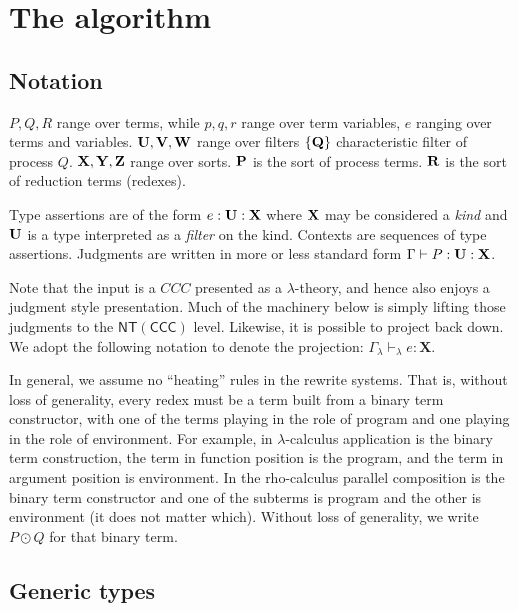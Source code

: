 \section{The algorithm}
\subsection{Notation}
$P, Q, R$ range over terms, while $p, q, r$ range over term variables,
$e$ ranging over terms and variables.  $\bold{U}, \bold{V}, \bold{W}$
range over filters $\bold{\{ Q \}}$ characteristic filter of process
$Q$.  $\bold{X}, \bold{Y}, \bold{Z}$ range over sorts.  $\bold{P}$ is
the sort of process terms.  $\bold{R}$ is the sort of reduction terms
(redexes).

Type assertions are of the form $e : \bold{U} : \bold{X}$ where
$\bold{X}$ may be considered a \emph{kind} and $\bold{U}$ is a type
interpreted as a \emph{filter} on the kind. Contexts are sequences of
type assertions. Judgments are written in more or less standard form
$\Gamma \vdash P : \bold{U} : \bold{X}$. 

Note that the input is a $CCC$ presented as a $\lambda$-theory, and
hence also enjoys a judgment style presentation. Much of the machinery
below is simply lifting those judgments to the
$\mathsf{NT}(\mathsf{CCC})$ level. Likewise, it is possible to project
back down. We adopt the following notation to denote the projection:
$\Gamma_{\lambda} \vdash_{\lambda} e : \mathbf{X}$.

In general, we assume no ``heating'' rules in the rewrite
systems. That is, without loss of generality, every redex must be a
term built from a binary term constructor, with one of the terms
playing in the role of program and one playing in the role of
environment. For example, in $\lambda$-calculus application is the
binary term construction, the term in function position is the
program, and the term in argument position is environment. In the
rho-calculus parallel composition is the binary term constructor and
one of the subterms is program and the other is environment (it does
not matter which). Without loss of generality, we write $P \odot Q$ for that binary term.

\subsection{Generic types}

